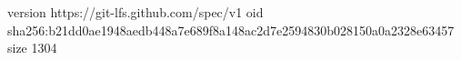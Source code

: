 version https://git-lfs.github.com/spec/v1
oid sha256:b21dd0ae1948aedb448a7e689f8a148ac2d7e2594830b028150a0a2328e63457
size 1304
